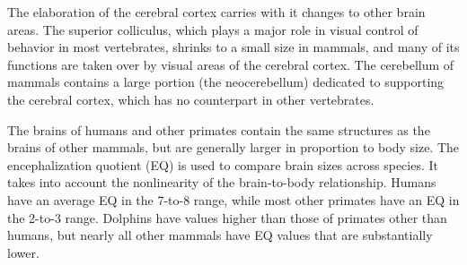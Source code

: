 The elaboration of the cerebral cortex carries with it changes to other brain areas. The superior colliculus, which plays a major role in visual control of behavior in most vertebrates, shrinks to a small size in mammals, and many of its functions are taken over by visual areas of the cerebral cortex. The cerebellum of mammals contains a large portion (the neocerebellum) dedicated to supporting the cerebral cortex, which has no counterpart in other vertebrates.

The brains of humans and other primates contain the same structures as the brains of other mammals, but are generally larger in proportion to body size. The encephalization quotient (EQ) is used to compare brain sizes across species. It takes into account the nonlinearity of the brain-to-body relationship. Humans have an average EQ in the 7-to-8 range, while most other primates have an EQ in the 2-to-3 range. Dolphins have values higher than those of primates other than humans, but nearly all other mammals have EQ values that are substantially lower.



